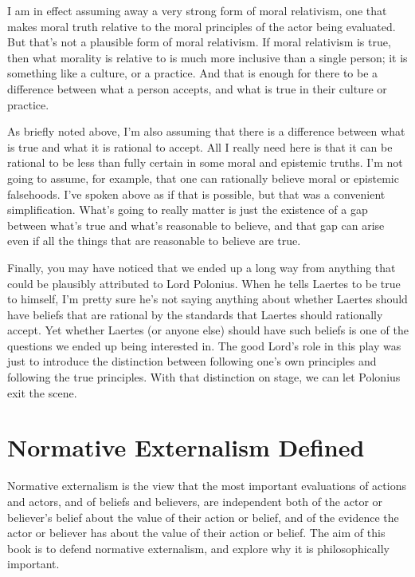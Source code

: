 I am in effect assuming away a very strong form of moral relativism, one that makes moral truth relative to the moral principles of the actor being evaluated. But that's not a plausible form of moral relativism. If moral relativism is true, then what morality is relative to is much more inclusive than a single person; it is something like a culture, or a practice. And that is enough for there to be a difference between what a person accepts, and what is true in their culture or practice.

As briefly noted above, I'm also assuming that there is a difference between what is true and what it is rational to accept. All I really need here is that it can be rational to be less than fully certain in some moral and epistemic truths. I'm not going to assume, for example, that one can rationally believe moral or epistemic falsehoods. I've spoken above as if that is possible, but that was a convenient simplification. What's going to really matter is just the existence of a gap between what's true and what's reasonable to believe, and that gap can arise even if all the things that are reasonable to believe are true.

Finally, you may have noticed that we ended up a long way from anything that could be plausibly attributed to Lord Polonius. When he tells Laertes to be true to himself, I'm pretty sure he's not saying anything about whether Laertes should have beliefs that are rational by the standards that Laertes should rationally accept. Yet whether Laertes (or anyone else) should have such beliefs is one of the questions we ended up being interested in. The good Lord's role in this play was just to introduce the distinction between following one's own principles and following the true principles. With that distinction on stage, we can let Polonius exit the scene.

\section{Normative Externalism Defined}
\label{normativeexternalismdefined}

Normative externalism is the view that the most important evaluations of actions and actors, and of beliefs and believers, are independent both of the actor or believer's belief about the value of their action or belief, and of the evidence the actor or believer has about the value of their action or belief. The aim of this book is to defend normative externalism, and explore why it is philosophically important.

